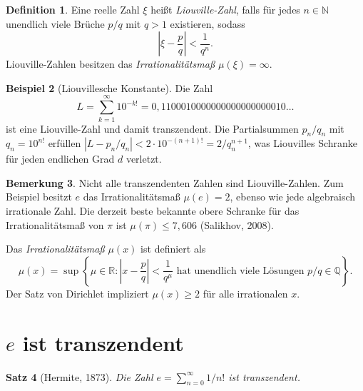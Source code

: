\documentclass[12pt,a4paper]{amsart}
\newtheorem{theorem}{Satz}[section]
\theoremstyle{definition}
\newtheorem{definition}[theorem]{Definition}
\newtheorem{beispiel}[theorem]{Beispiel}
\newtheorem{bemerkung}[theorem]{Bemerkung}
\begin{document}
\begin{definition}
Eine reelle Zahl $\xi$ heißt \emph{Liouville-Zahl}, falls für jedes $n \in
\mathbb{N}$ unendlich viele Brüche $p/q$ mit $q > 1$ existieren, sodass
\[
  \left|\xi - \frac{p}{q}\right| < \frac{1}{q^n}.
\]
Liouville-Zahlen besitzen das \emph{Irrationalitätsmaß} $\mu(\xi) = \infty$.
\end{definition}

\begin{beispiel}[Liouvillesche Konstante]
Die Zahl
\[
  L = \sum_{k=1}^{\infty} 10^{-k!}
  = 0{,}1100010000000000000000010\ldots
\]
ist eine Liouville-Zahl und damit transzendent. Die Partialsummen
$p_n/q_n$ mit $q_n = 10^{n!}$ erfüllen $|L - p_n/q_n| < 2 \cdot 10^{-(n+1)!}
= 2/q_n^{n+1}$, was Liouvilles Schranke für jeden endlichen Grad $d$ verletzt.
\end{beispiel}

\begin{bemerkung}
Nicht alle transzendenten Zahlen sind Liouville-Zahlen. Zum Beispiel besitzt
$e$ das Irrationalitätsmaß $\mu(e) = 2$, ebenso wie jede algebraisch irrationale
Zahl. Die derzeit beste bekannte obere Schranke für das Irrationalitätsmaß von $\pi$ ist $\mu(\pi) \leq 7{,}606$
(Salikhov, 2008).
\end{bemerkung}

Das \emph{Irrationalitätsmaß} $\mu(x)$ ist definiert als
\[
  \mu(x) = \sup\!\left\{\mu \in \mathbb{R} : \left|x - \frac{p}{q}\right|
  < \frac{1}{q^\mu} \text{ hat unendlich viele Lösungen } p/q \in \mathbb{Q}
  \right\}.
\]
Der Satz von Dirichlet impliziert $\mu(x) \geq 2$ für alle irrationalen $x$.


\section{\texorpdfstring{$e$ ist transzendent}{e ist transzendent}}
\label{sec:e-transz}

\begin{theorem}[Hermite, 1873]
\label{satz:e-transz}
Die Zahl $e = \sum_{n=0}^{\infty} 1/n!$ ist transzendent.
\end{theorem}
\end{document}
